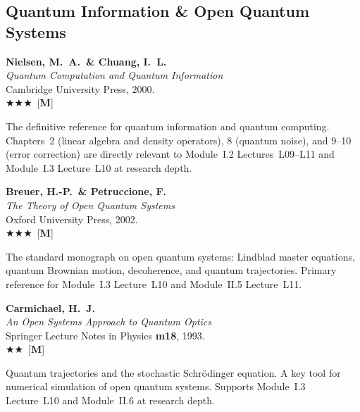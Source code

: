 \documentclass[11pt,a4paper]{article}
\newcommand{\essential}{$\bigstar\bigstar\bigstar$}
\newcommand{\recommended}{$\bigstar\bigstar$}
\newenvironment{bibentry}[1]{\begin{tcolorbox}[entrybox=#1,top=4pt,bottom=4pt]}{\end{tcolorbox}\smallskip}
\begin{document}
\subsection{Quantum Information \& Open Quantum Systems}

\begin{bibentry}{t5light}
\textbf{Nielsen, M.~A.\ \& Chuang, I.~L.}\\
\textit{Quantum Computation and Quantum Information}\\
Cambridge University Press, 2000.\\[3pt]
\essential\ [\textbf{M}]\\[3pt]
\begin{tcolorbox}[annotbox]
The definitive reference for quantum information and quantum computing. Chapters~2
(linear algebra and density operators), 8 (quantum noise), and 9--10 (error
correction) are directly relevant to Module~I.2 Lectures~L09--L11 and Module~I.3
Lecture~L10 at research depth.
\end{tcolorbox}
\end{bibentry}

\begin{bibentry}{t5light}
\textbf{Breuer, H.-P.\ \& Petruccione, F.}\\
\textit{The Theory of Open Quantum Systems}\\
Oxford University Press, 2002.\\[3pt]
\essential\ [\textbf{M}]\\[3pt]
\begin{tcolorbox}[annotbox]
The standard monograph on open quantum systems: Lindblad master equations,
quantum Brownian motion, decoherence, and quantum trajectories. Primary reference
for Module~I.3 Lecture~L10 and Module~II.5 Lecture~L11.
\end{tcolorbox}
\end{bibentry}

\begin{bibentry}{t5light}
\textbf{Carmichael, H.~J.}\\
\textit{An Open Systems Approach to Quantum Optics}\\
Springer Lecture Notes in Physics \textbf{m18}, 1993.\\[3pt]
\recommended\ [\textbf{M}]\\[3pt]
\begin{tcolorbox}[annotbox]
Quantum trajectories and the stochastic Schr\"odinger equation. A key tool for
numerical simulation of open quantum systems. Supports Module~I.3 Lecture~L10
and Module~II.6 at research depth.
\end{tcolorbox}
\end{bibentry}
\end{document}
